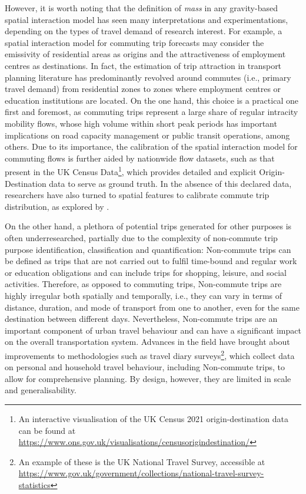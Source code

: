 However, it is worth noting that the definition of \textit{mass} in any gravity-based spatial interaction model has seen many interpretations and experimentations, depending on the types of travel demand of research interest. For example, a spatial interaction model for commuting trip forecasts may consider the emissivity of residential areas as origins and the attractiveness of employment centres as destinations. In fact, the estimation of trip attraction in transport planning literature has predominantly revolved around commutes (i.e., primary travel demand) from residential zones to zones where employment centres or education institutions are located. On the one hand, this choice is a practical one first and foremost, as commuting trips represent a large share of regular intracity mobility flows, whose high volume within short peak periods has important implications on road capacity management or public transit operations, among others. Due to its importance, the calibration of the spatial interaction model for commuting flows is further aided by nationwide flow datasets, such as that present in the UK Census Data\footnote{An interactive visualisation of the UK Census 2021 origin-destination data can be found at \url{https://www.ons.gov.uk/visualisations/censusorigindestination/}}, which provides detailed and explicit Origin-Destination data to serve as ground truth. In the absence of this declared data, researchers have also turned to spatial features to calibrate commute trip distribution, as explored by \cite{yangLimitsPredictabilityCommuting2014}.

On the other hand, a plethora of potential trips generated for other purposes is often underresearched, partially due to the complexity of non-commute trip purpose identification, classification and quantification: Non-commute trips can be defined as trips that are not carried out to fulfil time-bound and regular work or education obligations and can include trips for shopping, leisure, and social activities. Therefore, as opposed to commuting trips, Non-commute trips are highly irregular both spatially and temporally, i.e., they can vary in terms of distance, duration, and mode of transport from one to another, even for the same destination between different days. Nevertheless, Non-commute trips are an important component of urban travel behaviour and can have a significant impact on the overall transportation system. Advances in the field have brought about improvements to methodologies such as travel diary surveys\footnote{An example of these is the UK National Travel Survey, accessible at \url{https://www.gov.uk/government/collections/national-travel-survey-statistics}}, which collect data on personal and household travel behaviour, including Non-commute trips, to allow for comprehensive planning. By design, however, they are limited in scale and generalisability.

